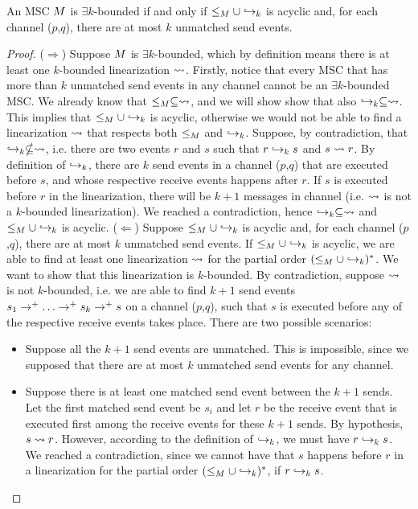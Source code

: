 \begin{proposition}\label{prop:asy_ek_def_alt}
	An MSC $M$ is $\exists k$-bounded if and only if $\le_M \cup \hookrightarrow_{k}$ is acyclic and, for each channel ($p$,$q$), there are at most $k$ unmatched send events.
\end{proposition}
\begin{proof}
	($\Rightarrow$) Suppose $M$ is $\exists k$-bounded, which by definition means there is at least one $k$-bounded linearization $\rightsquigarrow$. Firstly, notice that every MSC that has more than $k$ unmatched send events in any channel cannot be an $\exists k$-bounded MSC. We already know that $\le_M \subseteq \rightsquigarrow$, and we will show show that also $\hookrightarrow_{k} \subseteq \rightsquigarrow$. This implies that $\le_M \cup \hookrightarrow_{k}$ is acyclic, otherwise we would not be able to find a linearization $\rightsquigarrow$ that respects both $\le_M$ and $\hookrightarrow_{k}$. Suppose, by contradiction, that $\hookrightarrow_{k} \nsubseteq \rightsquigarrow$, i.e. there are two events $r$ and $s$ such that $r \hookrightarrow_{k} s$ and $s \rightsquigarrow r$. By definition of $\hookrightarrow_{k}$, there are $k$ send events in a channel ($p$,$q$) that are executed before $s$, and whose respective receive events happens after $r$. If $s$ is executed before $r$ in the linearization, there will be $k+1$ messages in channel (i.e. $\rightsquigarrow$ is not a $k$-bounded linearization). We reached a contradiction, hence $\hookrightarrow_{k} \subseteq \rightsquigarrow$ and $\le_M \cup \hookrightarrow_{k}$ is acyclic.\newline
	($\Leftarrow$) Suppose $\le_M \cup \hookrightarrow_{k}$ is acyclic and, for each channel ($p$,$q$), there are at most $k$ unmatched send events. If $\le_M \cup \hookrightarrow_{k}$ is acyclic, we are able to find at least one linearization $\rightsquigarrow$ for the partial order $(\le_M \cup \hookrightarrow_{k})^\ast$. We want to show that this linearization is $k$-bounded. By contradiction, suppose $\rightsquigarrow$ is not $k$-bounded, i.e. we are able to find $k+1$ send events $s_1 \procrel^+ \dots \procrel^+ s_k \procrel^+ s$ on a channel ($p$,$q$), such that $s$ is executed before any of the respective receive events takes place. There are two possible scenarios:
	\begin{itemize}\itemsep=0.5ex
		\item Suppose all the $k+1$ send events are unmatched. This is impossible, since we supposed that there are at most $k$ unmatched send events for any channel.
		\item Suppose there is at least one matched send event between the $k+1$ sends. Let the first matched send event be $s_i$ and let $r$ be the receive event that is executed first among the receive events for these $k+1$ sends. By hypothesis, $s \rightsquigarrow r$. However, according to the definition of $\hookrightarrow_{k}$, we must have $r \hookrightarrow_{k} s$. We reached a contradiction, since we cannot have that $s$ happens before $r$ in a linearization for the partial order $(\le_M \cup \hookrightarrow_{k})^\ast$, if $r \hookrightarrow_{k} s$.
	\end{itemize}
\end{proof}

